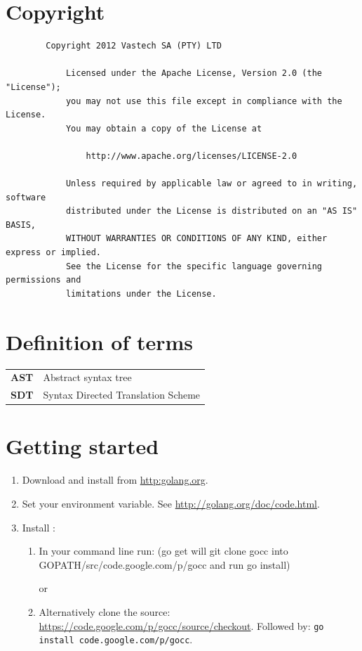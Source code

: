 \documentclass[12pt]{article}
\begin{document}
\section{Copyright}
	\begin{verbatim}
		Copyright 2012 Vastech SA (PTY) LTD
		
		    Licensed under the Apache License, Version 2.0 (the "License");
		    you may not use this file except in compliance with the License.
		    You may obtain a copy of the License at
		    
		        http://www.apache.org/licenses/LICENSE-2.0
		    
		    Unless required by applicable law or agreed to in writing, software
		    distributed under the License is distributed on an "AS IS" BASIS,
		    WITHOUT WARRANTIES OR CONDITIONS OF ANY KIND, either express or implied.
		    See the License for the specific language governing permissions and
		    limitations under the License.
	\end{verbatim}



\section{Definition of terms}
	\begin{longtable}{ll}
		\bf AST & Abstract syntax tree\\
		\bf SDT	& Syntax Directed Translation Scheme \\
	\end{longtable}

\section{Getting started}
	\begin{enumerate}
		\item Download and install \Go from \url{http:golang.org}.

		\item Set your  environment variable. See \url{http://golang.org/doc/code.html}.

		\item Install \gocc:
			\begin{enumerate}
				\item In your command line run:  (go get will git clone gocc into GOPATH/src/code.google.com/p/gocc and run go install)

					or 

				\item Alternatively clone the source: \url{https://code.google.com/p/gocc/source/checkout}. Followed by:
				\verb|go install code.google.com/p/gocc|.
			\end{enumerate}

	\end{enumerate}
\end{document}
